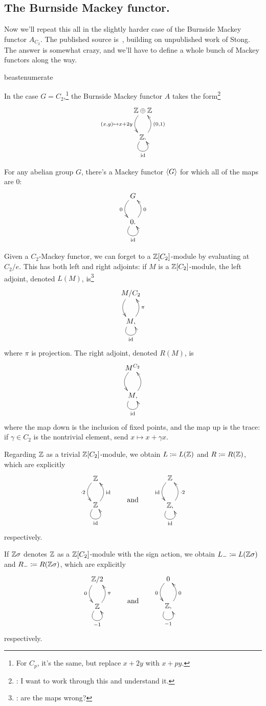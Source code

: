 \subsection*{The Burnside Mackey functor.}
Now we'll repeat this all in the slightly harder case of the Burnside Mackey functor $A_{C_2}$. The published
source is~\cite{Lew88}, building on unpublished work of Stong. The answer is somewhat crazy, and we'll have to
define a whole bunch of Mackey functors along the way.
\begin{comp}{beast}{enumerate}
	\item In the case $G = C_2$,\footnote{For $C_p$, it's the same, but replace $x+2y$ with $x+py$.} the Burnside
	Mackey functor $A$ takes the form\footnote{\TODO: I want to work through this and understand it.}
	\[\xymatrix{
		\Z\oplus\Z\ar@/_0.4cm/[d]_{(x,y)\mapsto x+2y}\\
		\Z.\ar@(dl,dr)_\id\ar@/_0.4cm/[u]_{(0,1)}
	}\]
	\item For any abelian group $G$, there's a Mackey functor $\langle G\rangle$ for which all of the maps are $0$:
	\[\xymatrix{
		G\ar@/_0.4cm/[d]_0\\
		0.\ar@(dl,dr)_\id\ar@/_0.4cm/[u]_0
	}\]
	\item Given a $C_2$-Mackey functor, we can forget to a $\mathbb Z[C_2]$-module by evaluating at $C_2/e$. This has
	both left and right adjoints: if $M$ is a $\mathbb Z[C_2]$-module, the left adjoint, denoted $L(M)$, is\footnote{\TODO:
	are the maps wrong?}
	\[\xymatrix{
		M/C_2\ar@/_0.4cm/[d]\\
		M,\ar@(dl,dr)_\id\ar@/_0.4cm/[u]_\pi
	}\]
	where $\pi$ is projection. The right adjoint, denoted $R(M)$, is
	\[\xymatrix{
		M^{C_2}\ar@/_0.4cm/[d]\\
		M,\ar@(dl,dr)_\id\ar@/_0.4cm/[u]
	}\]
	where the map down is the inclusion of fixed points, and the map up is the trace: if $\gamma\in C_2$ is the
	nontrivial element, send $x\mapsto x+\gamma x$.
	\item Regarding $\mathbb Z$ as a trivial $\mathbb Z[C_2]$-module, we obtain $L\coloneqq L(\mathbb Z)$ and $R\coloneqq R(\mathbb Z)$, which
	are explicitly
	\[\gathxy{
		\Z\ar@/_0.4cm/[d]_{\cdot 2}\\
		\Z\ar@(dl,dr)_\id\ar@/_0.4cm/[u]_\id
	}\qquad\text{and}\qquad
	\gathxy{
		\Z\ar@/_0.4cm/[d]_\id\\
		\Z,\ar@(dl,dr)_\id\ar@/_0.4cm/[u]_{\cdot 2}
	}
	\]
	respectively.
	\item If $\mathbb Z\sigma$ denotes $\mathbb Z$ as a $\mathbb Z[C_2]$-module with the sign action, we obtain $L_-\coloneqq
	L(\mathbb Z\sigma)$ and $R_-\coloneqq R(\mathbb Z\sigma)$, which are explicitly
	\[\gathxy{
		\Z/2\ar@/_0.4cm/[d]_0\\
		\Z\ar@(dl,dr)_{-1}\ar@/_0.4cm/[u]_\pi
	}\qquad\text{and}\qquad
	\gathxy{
		0\ar@/_0.4cm/[d]_0\\
		\Z,\ar@(dl,dr)_{-1}\ar@/_0.4cm/[u]_0
	}
	\]
	respectively.
\end{comp}
